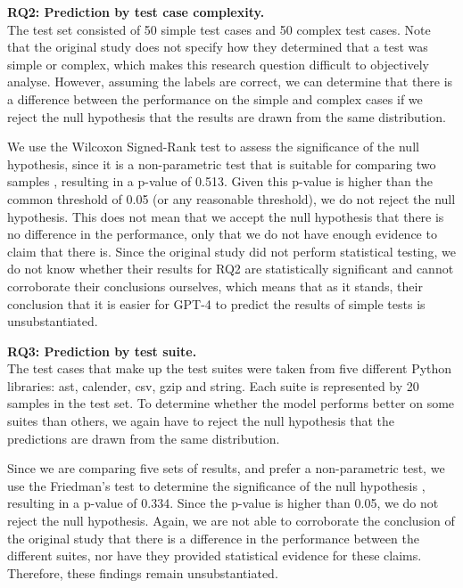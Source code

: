 \documentclass[a4paper]{article}
\begin{document}
\textbf{RQ2: Prediction by test case complexity.}\\
The test set consisted of 50 simple test cases and 50 complex test cases. Note that the original study does not specify how they determined that a test was simple or complex, which makes this research question difficult to objectively analyse. However, assuming the labels are correct, we can determine that there is a difference between the performance on the simple and complex cases if we reject the null hypothesis that the results are drawn from the same distribution. 

We use the Wilcoxon Signed-Rank test to assess the significance of the null hypothesis, since it is a non-parametric test that is suitable for comparing two samples \cite{Dellanna2022,Rainio2024}, resulting in a p-value of 0.513. Given this p-value is higher than the common threshold of 0.05 (or any reasonable threshold), we do not reject the null hypothesis. This does not mean that we accept the null hypothesis that there is no difference in the performance, only that we do not have enough evidence to claim that there is. Since the original study did not perform statistical testing, we do not know whether their results for RQ2 are statistically significant and cannot corroborate their conclusions ourselves, which means that as it stands, their conclusion that it is easier for GPT-4 to predict the results of simple tests is unsubstantiated. 

\textbf{RQ3: Prediction by test suite.}\\
The test cases that make up the test suites were taken from five different Python libraries: ast, calender, csv, gzip and string. Each suite is represented by 20 samples in the test set. To determine whether the model performs better on some suites than others, we again have to reject the null hypothesis that the predictions are drawn from the same distribution. 

Since we are comparing five sets of results, and prefer a non-parametric test, we use the Friedman's test to determine the significance of the null hypothesis \cite{Dellanna2022,Rainio2024}, resulting in a p-value of 0.334. Since the p-value is higher than 0.05, we do not reject the null hypothesis. Again, we are not able to corroborate the conclusion of the original study that there is a difference in the performance between the different suites, nor have they provided statistical evidence for these claims. Therefore, these findings remain unsubstantiated.\\
\end{document}
